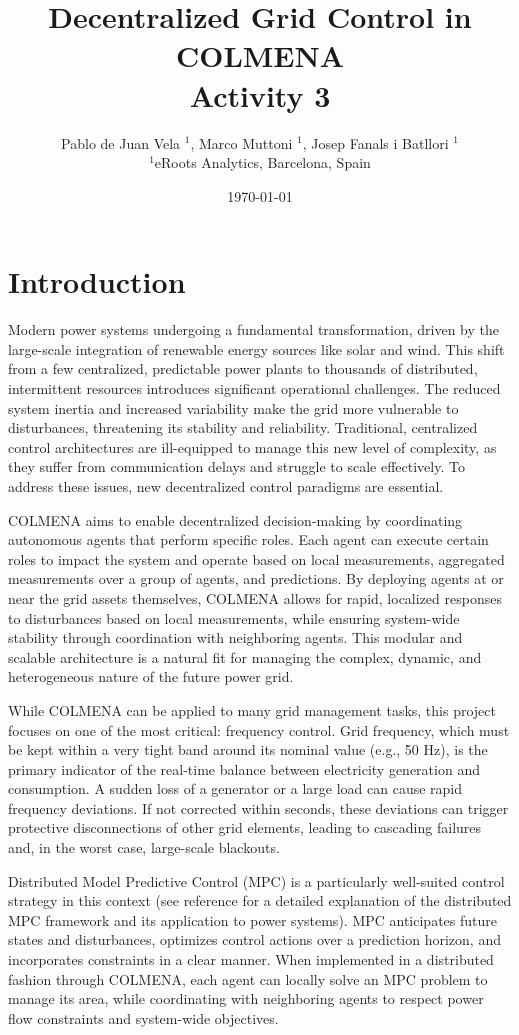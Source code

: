 \documentclass{article}
\title{Decentralized Grid Control in COLMENA \\ Activity 3}
\author{Pablo de Juan Vela $^{1}$, Marco Muttoni $^{1}$, Josep Fanals i Batllori $^{1}$ \\
        \small $^{1}$eRoots Analytics, Barcelona, Spain \\
}
\date{\today}
\begin{document}
\maketitle
\section{Introduction}
Modern power systems undergoing a fundamental transformation, driven by the large-scale integration of renewable energy sources like solar and wind. This shift from a few centralized, predictable power plants to thousands of distributed, intermittent resources introduces significant operational challenges. The reduced system inertia and increased variability make the grid more vulnerable to disturbances, threatening its stability and reliability. Traditional, centralized control architectures are ill-equipped to manage this new level of complexity, as they suffer from communication delays and struggle to scale effectively. To address these issues, new decentralized control paradigms are essential. 

COLMENA aims to enable decentralized decision-making by coordinating autonomous agents that perform specific roles. Each agent can execute certain roles to impact the system and operate based on local measurements, aggregated measurements over a group of agents, and predictions. By deploying agents at or near the grid assets themselves, COLMENA allows for rapid, localized responses to disturbances based on local measurements, while ensuring system-wide stability through coordination with neighboring agents. This modular and scalable architecture is a natural fit for managing the complex, dynamic, and heterogeneous nature of the future power grid.

While COLMENA can be applied to many grid management tasks, this project focuses on one of the most critical: frequency control. Grid frequency, which must be kept within a very tight band around its nominal value (e.g., 50 Hz), is the primary indicator of the real-time balance between electricity generation and consumption. A sudden loss of a generator or a large load can cause rapid frequency deviations. If not corrected within seconds, these deviations can trigger protective disconnections of other grid elements, leading to cascading failures and, in the worst case, large-scale blackouts.

Distributed Model Predictive Control (MPC) is a particularly well-suited control strategy in this context (see reference \cite{venkat2008distributed} for a detailed explanation of the distributed MPC framework and its application to power systems). MPC anticipates future states and disturbances, optimizes control actions over a prediction horizon, and incorporates constraints in a clear manner. When implemented in a distributed fashion through COLMENA, each agent can locally solve an MPC problem to manage its area, while coordinating with neighboring agents to respect power flow constraints and system-wide objectives. 
\end{document}
